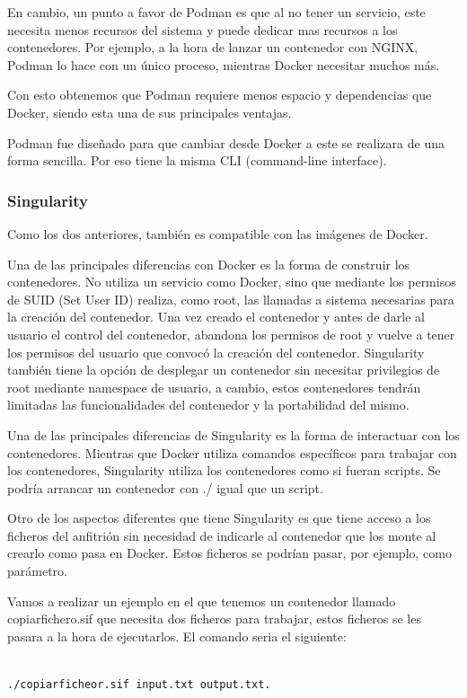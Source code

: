 \documentclass[11pt,a4paper]{article}
\begin{document}
En cambio, un punto a favor de Podman es que al no tener un servicio, este necesita menos recursos del sistema y puede dedicar mas recursos a los contenedores. Por ejemplo, a la hora de lanzar un contenedor con NGINX, Podman lo hace con un único proceso, mientras Docker necesitar muchos más.

Con esto obtenemos que Podman requiere menos espacio y dependencias que Docker, siendo esta una de sus principales ventajas.

Podman fue diseñado para que cambiar desde Docker a este se realizara de una forma sencilla. Por eso tiene la misma CLI (command-line interface). 

\subsubsection{Singularity}
Como los dos anteriores, también es compatible con las imágenes de Docker. 

Una de las principales diferencias con Docker es la forma de construir los contenedores. No utiliza un servicio como Docker, sino que mediante los permisos de SUID (Set User ID) realiza, como root, las llamadas a sistema necesarias para la creación del contenedor. Una vez creado el contenedor y antes de darle al usuario el control del contenedor, abandona los permisos de root y vuelve a tener los permisos del usuario que convocó la creación del contenedor. 
Singularity también tiene la opción de desplegar un contenedor sin necesitar privilegios de root mediante namespace de usuario, a cambio, estos contenedores tendrán limitadas las funcionalidades del contenedor y la portabilidad del mismo. 

Una de las principales diferencias de Singularity es la forma de interactuar con los contenedores. Mientras que Docker utiliza comandos específicos para trabajar con los contenedores, Singularity utiliza los contenedores como si fueran scripts. Se podría arrancar un contenedor con ./ igual que un script. 

Otro de los aspectos diferentes que tiene Singularity es que tiene acceso a los ficheros del anfitrión sin necesidad de indicarle al contenedor que los monte al crearlo como pasa en Docker. Estos ficheros se podrían pasar, por ejemplo, como parámetro.

Vamos a realizar un ejemplo en el que tenemos un contenedor llamado copiarfichero.sif que necesita dos ficheros para trabajar, estos ficheros se les pasara a la hora de ejecutarlos. El comando seria el siguiente:
\begin{verbatim}

./copiarficheor.sif input.txt output.txt. ­

\end{verbatim}
\end{document}
